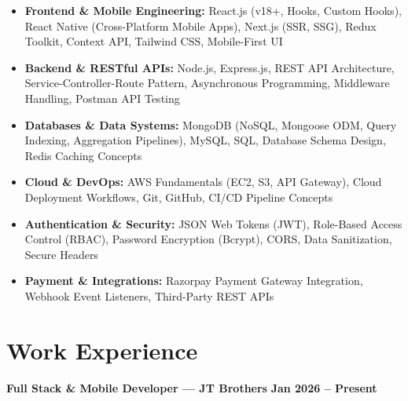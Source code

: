 \documentclass[a4paper,10pt]{article}
\begin{document}
\begin{itemize}

    \item \textbf{Frontend \& Mobile Engineering:}
    React.js (v18+, Hooks, Custom Hooks), React Native (Cross-Platform Mobile Apps),
    Next.js (SSR, SSG), Redux Toolkit, Context API, Tailwind CSS, Mobile-First UI

    \item \textbf{Backend \& RESTful APIs:}
    Node.js, Express.js, REST API Architecture, Service-Controller-Route Pattern,
    Asynchronous Programming, Middleware Handling, Postman API Testing

    \item \textbf{Databases \& Data Systems:}
    MongoDB (NoSQL, Mongoose ODM, Query Indexing, Aggregation Pipelines),
    MySQL, SQL, Database Schema Design, Redis Caching Concepts

    \item \textbf{Cloud \& DevOps:}
    AWS Fundamentals (EC2, S3, API Gateway), Cloud Deployment Workflows,
    Git, GitHub, CI/CD Pipeline Concepts

    \item \textbf{Authentication \& Security:}
    JSON Web Tokens (JWT), Role-Based Access Control (RBAC),
    Password Encryption (Bcrypt), CORS, Data Sanitization, Secure Headers

    \item \textbf{Payment \& Integrations:}
    Razorpay Payment Gateway Integration, Webhook Event Listeners, Third-Party REST APIs

\end{itemize}

\section*{Work Experience}

\textbf{Full Stack \& Mobile Developer --- JT Brothers}
\hfill
\textbf{Jan 2026 -- Present}
\end{document}
